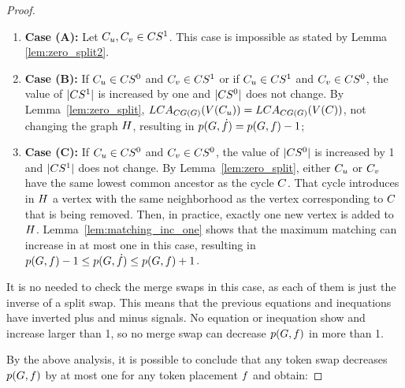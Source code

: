 \documentclass[msc,english,table,xcdraw]{ppgccufmg}
\begin{document}
\begin{proof}
\begin{itemize}
    \begin{enumerate}
        \item[] \textbf{Case (A):} Let $C_{u},C_{v} \in CS^{1}$.
        This case is impossible as stated by Lemma \ref{lem:zero_split2}.
        \item[] \textbf{Case (B):} If  $C_{u} \in CS^{0}$ and 
        $C_{v} \in CS^{1}$ or if  $C_{u} \in CS^{1}$ and 
        $C_{v} \in CS^{0}$, the value of $|CS^{1}|$
        is increased by one and $|CS^{0}|$ does not change.
        By Lemma~\ref{lem:zero_split}, $LCA_{CG(G)}(V(C_{u} )) = LCA_{CG(G)}(V(C))$, not changing the graph $H$, resulting
        in $p(G, \dot{f}) = p(G, f) - 1$;
        \item[] \textbf{Case (C):} If $C_{u} \in CS^{0}$ and 
        $C_{v} \in CS^{0}$, the value of $|CS^{0}|$
        is increased by 1 and $|CS^{1}|$ does not change.
        By Lemma~\ref{lem:zero_split}, either $C_{u}$ or $C_{v}$
        have the same lowest common ancestor as the cycle $C$. That cycle introduces in $H$ a vertex with the same neighborhood as the vertex corresponding to $C$ that is being removed. Then, in practice, exactly one new vertex is added to $H$. Lemma~\ref{lem:matching_inc_one} shows that the maximum matching can increase in 
        at most one in this case, resulting in $p(G, f) - 1 
        \leq p(G, \dot{f}) \leq p(G, 
        f) + 1$.
    \end{enumerate}
    
\end{itemize}

It is no needed to check the merge swaps in this case, as each of them is just the inverse
of a split swap.
This means that the previous equations and inequations have inverted plus and minus signals. No equation or inequation show and increase larger than 1, so no merge swap can decrease $p(G, f)$
in more than 1.

By the above analysis, it is possible to conclude that any token swap decreases
$p(G, f)$ by at most one for any token placement $f$ and
obtain:
    

\end{proof}
\end{document}
